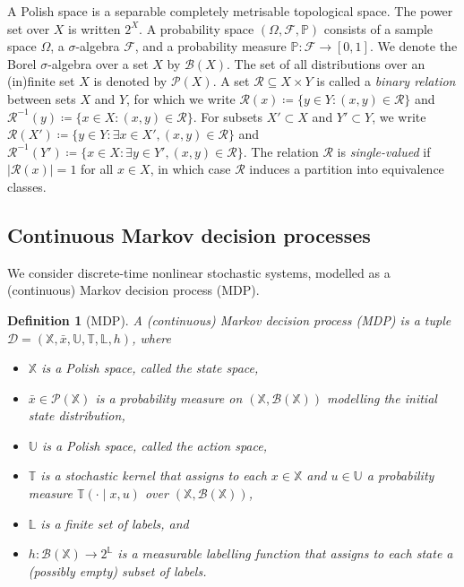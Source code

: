\documentclass[letterpaper, 10 pt, conference]{ieeeconf}  %
\newtheorem{definition}{Definition}
\newcommand*{\States}{\ensuremath{\mathbb{X}}}
\newcommand*{\Actions}{\ensuremath{\mathbb{U}}}
\newcommand*{\Labels}{\ensuremath{\mathbb{L}}}
\newcommand*{\initState}{\ensuremath{\bar{x}}}
\newcommand*{\transfunc}{\ensuremath{\mathbb{T}}}
\newcommand*{\labelfunc}{\ensuremath{h}}
\newcommand*{\mdp}{\ensuremath{\mathcal{D}}}
\newcommand*{\MDP}{\ensuremath{\tuple{\States,\initState,\Actions,\transfunc,\Labels,\labelfunc}}}
\newcommand*{\tuple}[1]{\left(#1\right)}
\newcommand*{\inv}{\ensuremath{{-1}}}
\newcommand*{\Relation}{\mathcal{R}}
\newcommand*{\Relinv}[1]{\Relation^\inv({#1})}
\newcommand*{\Rel}[1]{\Relation({#1})}
\newcommand*{\Prob}{\mathbb{P}}
\newcommand*{\distr}[1]{\mathcal{P}(#1)}
\newcommand*{\Borel}[1]{\ensuremath{\mathcal{B}(#1)}}
\begin{document}
A Polish space is a separable completely metrisable topo\-logical space. %
The power set %
over $X$ is written $2^X$.
A probability space $\tuple{\Omega, \mathcal{F}, \Prob}$ consists of a sample space $\Omega$, a $\sigma$-algebra $\mathcal{F}$, and a probability measure $\Prob \colon \mathcal{F} \to [0,1]$.
We denote the Borel $\sigma$-algebra over a set $X$ by $\Borel{X}$.
The set of all distributions over an (in)finite set $X$ is denoted by $\distr{X}$.
A set $\Relation \subseteq X \times Y$ is called a \emph{binary relation} between sets $X$ and $Y$, for which we write $\Rel{x} \coloneqq \{ y \in Y: (x,y) \in \Relation \}$ and $\Relinv{y} \coloneqq \{ x \in X : (x,y) \in \Relation \}$.
For subsets $X' \subset X$ and $Y' \subset Y$, we write $\Rel{X'} \coloneqq \{ y \in Y: \exists x \in X', (x,y) \in \Relation \}$ and $\Relinv{Y'} \coloneqq \{ x \in X: \exists y \in Y', (x,y) \in \Relation \}$.
The relation $\Relation$ is \emph{single-valued} if $|\Rel{x}| = 1$ for all $x \in X$, in which case $\Relation$ induces a partition into equivalence classes.



\subsection{Continuous Markov decision processes}
We consider discrete-time nonlinear stochastic systems, modelled as a (continuous) Markov decision process (MDP).

\begin{definition}[MDP]
    \label{def:MDP}
    A (continuous) Markov decision process (MDP) is a tuple $\mdp = \MDP$, where
    \begin{itemize}
        \item $\States$ is a Polish space, called the \emph{state space},
        \item $\initState \in \distr{\States}$ is a probability measure on $(\States,\Borel{\States})$ modelling the \emph{initial state distribution},
        \item $\Actions$ is a Polish space, called the \emph{action space},
        \item $\transfunc$ is a \emph{stochastic kernel} that assigns to each $x \in \States$ and $u \in \Actions$ a probability measure $\transfunc(\cdot \mid x,u)$ over $(\States,\Borel{\States})$,
        \item $\Labels$ is a finite set of labels, and
        \item $\labelfunc \colon \Borel{\States} \to 2^\Labels$ is a measurable \emph{labelling function} that assigns to each state a (possibly empty) subset of labels.
    \end{itemize}
\end{definition}
\end{document}
